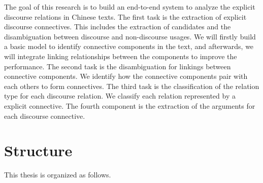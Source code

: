The goal of this research is to build an end-to-end system to analyze
the explicit discourse relations in Chinese texts. The first task is
the extraction of explicit discourse connectives. This includes
the extraction of candidates and the disambiguation between discourse
and non-discourse usages. We will firstly build a basic model to identify
connective components in the text, and afterwards, we will integrate linking
relationships between the components to improve the performance.
The second task is the disambiguation for linkings between connective components.
We identify how the connective components pair with each others to form connectives.
The third task is the classification of the relation type for each discourse relation.
We classify each relation represented by a explicit connective.
The fourth component is the extraction of the arguments for each discourse connective.

%
%
\section{Structure}
This thesis is organized as follows.

